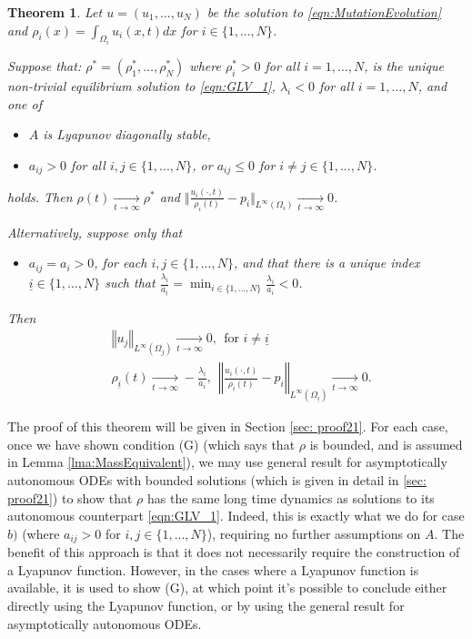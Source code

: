 \documentclass{article}
\newtheorem{theorem}{Theorem}[section]
\begin{document}
\begin{theorem}\label{thm:Global_attractors_BD}
Let $u=(u_1,...,u_N)$ be the solution to \eqref{eqn:MutationEvolution} and $\rho_i(x)=\int_{\Omega_i}u_i(x,t)dx$ for $i\in\{1,...,N\}$.  


Suppose that:  $\rho^{*}=(\rho_1^*,\ldots, \rho_N^*)$ where $\rho_i^*>0$ for all $i=1,\ldots, N$, is the unique non-trivial equilibrium solution to \eqref{eqn:GLV_1}, $\lambda_i<0$ for all $i=1,\ldots, N$, and one of
\begin{itemize}
    \item[a)]  $A$ is Lyapunov diagonally stable, 
    \item[b)]  $a_{ij}>0$ for all $i,j\in\{1,...,N\}$, or $a_{ij}\leq{}0$ for $i\neq{j}\in\{1,...,N\}$.
\end{itemize}
holds. Then $\rho(t)\xrightarrow[t\rightarrow\infty]{}\rho^{*}$ and $\Vert{}\frac{u_i(\cdot,t)}{\rho_i(t)}-p_i\Vert_{L^\infty(\Omega_i)}\xrightarrow[t\rightarrow\infty]{}0$.

Alternatively, suppose only that

\begin{itemize}
    \item[c)] $a_{ij}=a_i>0$,  for each $i,j\in\{1,...,N\}$, and that there is a unique index $\underline{i}\in\{1,...,N\}$ such that $\frac{\lambda_{\underline{i}}}{a_{\underline{i}}}=\min_{i\in\{1,...,N\}}\frac{\lambda_i}{a_i}<0$.
\end{itemize} 
Then
   \begin{align*}
       &\left\Vert{u_j}\right\Vert_{L^\infty(\Omega_j)}\xrightarrow[t\rightarrow\infty]{}0,~~\text{for }i\neq{}\underline{i}\\
       &\rho_{\underline{i}}(t)\xrightarrow[t\rightarrow\infty]{}-\frac{\lambda_{\underline{i}}}{a_i},~~ \left\Vert{}\frac{u_{\underline{i}}(\cdot,t)}{\rho_{\underline{i}}(t)}-p_i\right\Vert_{L^\infty(\Omega_{\underline{i}})}\xrightarrow[t\rightarrow\infty]{}0.
   \end{align*}



\end{theorem}
The proof of this theorem will be given in Section \ref{sec: proof21}. For each case, once we have shown condition (G) (which says that $\rho$ is bounded, and is assumed in Lemma \ref{lma:MassEquivalent}), we may use general result for asymptotically autonomous ODEs with bounded solutions (which is given in detail in \ref{sec: proof21}) to show that $\rho$ has the same long time dynamics as solutions to its autonomous counterpart \eqref{eqn:GLV_1}. Indeed, this is exactly what we do for case $b)$ (where $a_{ij}>0$ for $i,j\in\{1,...,N\}$), requiring no further assumptions on $A$. The benefit of this approach is that it does not necessarily require the construction of a Lyapunov function. However, in the cases where a Lyapunov function is available, it is used to show (G), at which point it's possible to conclude either directly using the Lyapunov function, or by using the general result for asymptotically autonomous ODEs. 
\end{document}
